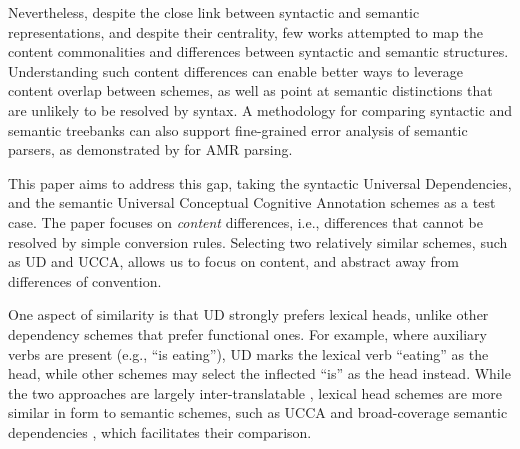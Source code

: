 \documentclass[11pt,a4paper]{article}
\begin{document}
  Nevertheless, despite the close link between syntactic and semantic representations,
  and despite their centrality, few works attempted to map the content commonalities and differences between syntactic and semantic structures.
  Understanding such content differences can enable better ways to leverage content overlap between schemes, as well as point at semantic distinctions that are unlikely to be resolved by syntax.
   A methodology for comparing syntactic and semantic treebanks can also support fine-grained error analysis of semantic parsers, as demonstrated by \citet{szubert2018structured} for AMR \cite{banarescu2013abstract}
   parsing.
   
   This paper aims to address this gap, taking the syntactic Universal Dependencies,
  and the semantic Universal Conceptual Cognitive Annotation \cite[UCCA; ][]{abend2013universal} schemes as a test case. 
  The paper focuses on {\it content} differences, i.e., differences that cannot be resolved by simple
  conversion rules. Selecting two relatively similar schemes, such as UD and UCCA, allows
  us to focus on content, and abstract away from differences of convention.
  
  One aspect of similarity is that UD strongly prefers lexical heads,
   unlike other dependency schemes that prefer functional ones.
   For example, where auxiliary verbs are present (e.g., ``is eating''), UD
   marks the lexical verb ``eating'' as the head, while other schemes
   may select the inflected ``is'' as the head instead.
  While the two approaches are largely inter-translatable
   \cite{Schwartz:12}, lexical head schemes are more similar in form to semantic schemes,
   such as UCCA and broad-coverage semantic dependencies \cite{oepen2016towards},
   which facilitates their comparison.


  
\end{document}
